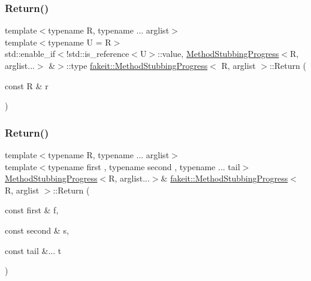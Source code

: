 \mbox{\label{structfakeit_1_1MethodStubbingProgress_ab97be63c322887db40cb788d28875fea}} 
\subsubsection{\texorpdfstring{Return()}{Return()}\hspace{0.1cm}{\footnotesize\ttfamily [16/45]}}
{\footnotesize\ttfamily template$<$typename R, typename ... arglist$>$ \\
template$<$typename U  = R$>$ \\
std\+::enable\+\_\+if$<$!std\+::is\+\_\+reference$<$U$>$\+::value, \mbox{\hyperlink{structfakeit_1_1MethodStubbingProgress}{Method\+Stubbing\+Progress}}$<$R, arglist...$>$ \&$>$\+::type \mbox{\hyperlink{structfakeit_1_1MethodStubbingProgress}{fakeit\+::\+Method\+Stubbing\+Progress}}$<$ R, arglist $>$\+::Return (\begin{DoxyParamCaption}\item[{const R \&}]{r }\end{DoxyParamCaption})\hspace{0.3cm}{\ttfamily [inline]}}

\mbox{\label{structfakeit_1_1MethodStubbingProgress_ae8417ec5f29f70be1ae914755b05e4db}} 
\subsubsection{\texorpdfstring{Return()}{Return()}\hspace{0.1cm}{\footnotesize\ttfamily [17/45]}}
{\footnotesize\ttfamily template$<$typename R, typename ... arglist$>$ \\
template$<$typename first , typename second , typename ... tail$>$ \\
\mbox{\hyperlink{structfakeit_1_1MethodStubbingProgress}{Method\+Stubbing\+Progress}}$<$R, arglist...$>$\& \mbox{\hyperlink{structfakeit_1_1MethodStubbingProgress}{fakeit\+::\+Method\+Stubbing\+Progress}}$<$ R, arglist $>$\+::Return (\begin{DoxyParamCaption}\item[{const first \&}]{f,  }\item[{const second \&}]{s,  }\item[{const tail \&...}]{t }\end{DoxyParamCaption})\hspace{0.3cm}{\ttfamily [inline]}}

